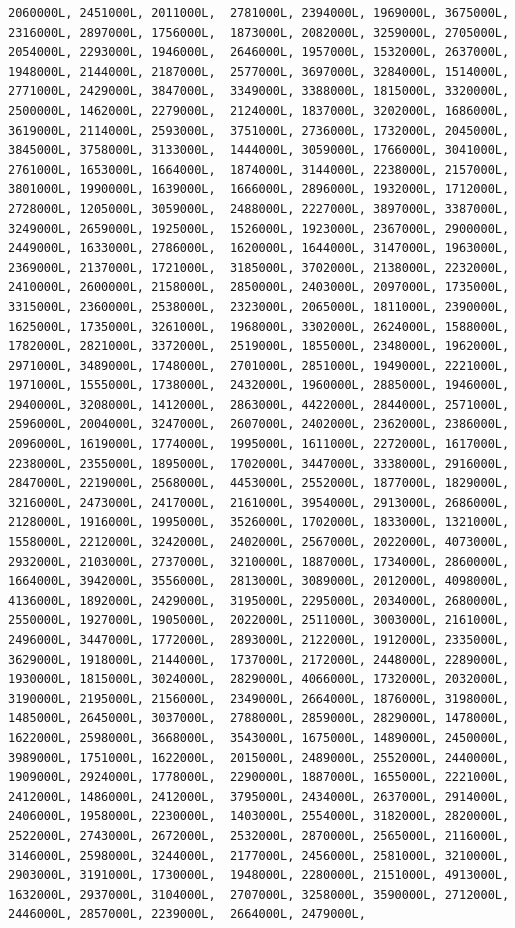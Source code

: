 \documentclass[
]{article}
\begin{document}
\begin{verbatim}
2060000L, 2451000L, 2011000L,  2781000L, 2394000L, 1969000L, 3675000L, 2316000L, 2897000L, 1756000L,  1873000L, 2082000L, 3259000L, 2705000L, 2054000L, 2293000L, 1946000L,  2646000L, 1957000L, 1532000L, 2637000L, 1948000L, 2144000L, 2187000L,  2577000L, 3697000L, 3284000L, 1514000L, 2771000L, 2429000L, 3847000L,  3349000L, 3388000L, 1815000L, 3320000L, 2500000L, 1462000L, 2279000L,  2124000L, 1837000L, 3202000L, 1686000L, 3619000L, 2114000L, 2593000L,  3751000L, 2736000L, 1732000L, 2045000L, 3845000L, 3758000L, 3133000L,  1444000L, 3059000L, 1766000L, 3041000L, 2761000L, 1653000L, 1664000L,  1874000L, 3144000L, 2238000L, 2157000L, 3801000L, 1990000L, 1639000L,  1666000L, 2896000L, 1932000L, 1712000L, 2728000L, 1205000L, 3059000L,  2488000L, 2227000L, 3897000L, 3387000L, 3249000L, 2659000L, 1925000L,  1526000L, 1923000L, 2367000L, 2900000L, 2449000L, 1633000L, 2786000L,  1620000L, 1644000L, 3147000L, 1963000L, 2369000L, 2137000L, 1721000L,  3185000L, 3702000L, 2138000L, 2232000L, 2410000L, 2600000L, 2158000L,  2850000L, 2403000L, 2097000L, 1735000L, 3315000L, 2360000L, 2538000L,  2323000L, 2065000L, 1811000L, 2390000L, 1625000L, 1735000L, 3261000L,  1968000L, 3302000L, 2624000L, 1588000L, 1782000L, 2821000L, 3372000L,  2519000L, 1855000L, 2348000L, 1962000L, 2971000L, 3489000L, 1748000L,  2701000L, 2851000L, 1949000L, 2221000L, 1971000L, 1555000L, 1738000L,  2432000L, 1960000L, 2885000L, 1946000L, 2940000L, 3208000L, 1412000L,  2863000L, 4422000L, 2844000L, 2571000L, 2596000L, 2004000L, 3247000L,  2607000L, 2402000L, 2362000L, 2386000L, 2096000L, 1619000L, 1774000L,  1995000L, 1611000L, 2272000L, 1617000L, 2238000L, 2355000L, 1895000L,  1702000L, 3447000L, 3338000L, 2916000L, 2847000L, 2219000L, 2568000L,  4453000L, 2552000L, 1877000L, 1829000L, 3216000L, 2473000L, 2417000L,  2161000L, 3954000L, 2913000L, 2686000L, 2128000L, 1916000L, 1995000L,  3526000L, 1702000L, 1833000L, 1321000L, 1558000L, 2212000L, 3242000L,  2402000L, 2567000L, 2022000L, 4073000L, 2932000L, 2103000L, 2737000L,  3210000L, 1887000L, 1734000L, 2860000L, 1664000L, 3942000L, 3556000L,  2813000L, 3089000L, 2012000L, 4098000L, 4136000L, 1892000L, 2429000L,  3195000L, 2295000L, 2034000L, 2680000L, 2550000L, 1927000L, 1905000L,  2022000L, 2511000L, 3003000L, 2161000L, 2496000L, 3447000L, 1772000L,  2893000L, 2122000L, 1912000L, 2335000L, 3629000L, 1918000L, 2144000L,  1737000L, 2172000L, 2448000L, 2289000L, 1930000L, 1815000L, 3024000L,  2829000L, 4066000L, 1732000L, 2032000L, 3190000L, 2195000L, 2156000L,  2349000L, 2664000L, 1876000L, 3198000L, 1485000L, 2645000L, 3037000L,  2788000L, 2859000L, 2829000L, 1478000L, 1622000L, 2598000L, 3668000L,  3543000L, 1675000L, 1489000L, 2450000L, 3989000L, 1751000L, 1622000L,  2015000L, 2489000L, 2552000L, 2440000L, 1909000L, 2924000L, 1778000L,  2290000L, 1887000L, 1655000L, 2221000L, 2412000L, 1486000L, 2412000L,  3795000L, 2434000L, 2637000L, 2914000L, 2406000L, 1958000L, 2230000L,  1403000L, 2554000L, 3182000L, 2820000L, 2522000L, 2743000L, 2672000L,  2532000L, 2870000L, 2565000L, 2116000L, 3146000L, 2598000L, 3244000L,  2177000L, 2456000L, 2581000L, 3210000L, 2903000L, 3191000L, 1730000L,  1948000L, 2280000L, 2151000L, 4913000L, 1632000L, 2937000L, 3104000L,  2707000L, 3258000L, 3590000L, 2712000L, 2446000L, 2857000L, 2239000L,  2664000L, 2479000L, 
\end{verbatim}
\end{document}
